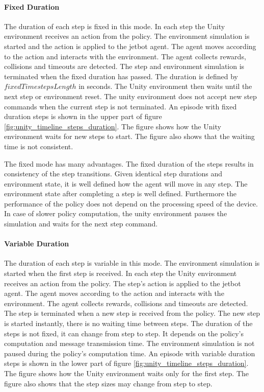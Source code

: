\paragraph{Fixed Duration}

The duration of each step is fixed in this mode. In each step the Unity environment receives an action from the policy. The environment simulation is started and the action is applied to the jetbot agent. The agent moves according to the action and interacts with the environment. The agent collects rewards, collisions and timeouts are detected. The step and environment simulation is terminated when the fixed duration has passed. The duration is defined by $fixedTimestepsLength$ in seconds. The Unity environment then waits until the next step or environment reset. The unity environment does not accept new step commands when the current step is not terminated.
An episode with fixed duration steps is shown in the upper part of figure \ref{fig:unity_timeline_steps_duration}. The figure shows how the Unity environment waits for new steps to start. The figure also shows that the waiting time is not consistent.

The fixed mode has many advantages. The fixed duration of the steps results in consistency of the step transitions. Given identical step durations and environment state, it is well defined how the agent will move in any step. The environment state after completing a step is well defined.
Furthermore the performance of the policy does not depend on the processing speed of the device. In case of slower policy computation, the unity environment pauses the simulation and waits for the next step command.




\paragraph{Variable Duration}

The duration of each step is variable in this mode. The environment simulation is started when the first step is received. In each step the Unity environment receives an action from the policy. The step's action is applied to the jetbot agent. The agent moves according to the action and interacts with the environment. The agent collects rewards, collisions and timeouts are detected. The step is terminated when a new step is received from the policy. The new step is started instantly, there is no waiting time between steps. 
The duration of the steps is not fixed, it can change from step to step. It depends on the policy's computation and message transmission time. The environment simulation is not paused during the policy's computation time. 
An episode with variable duration steps is shown in the lower part of figure \ref{fig:unity_timeline_steps_duration}. The figure shows how the Unity environment waits only for the first step. The figure also shows that the step sizes may change from step to step.


